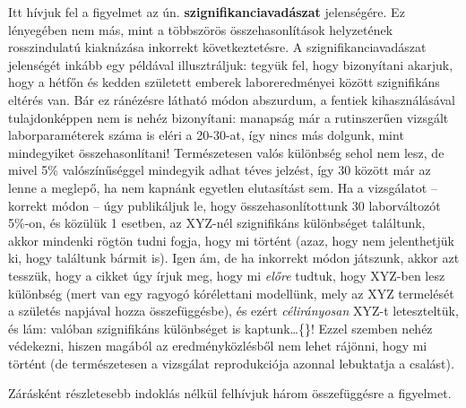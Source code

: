 \documentclass[
]{book}
\begin{document}
Itt hívjuk fel a figyelmet az ún. \textbf{szignifikanciavadászat} jelenségére. Ez lényegében nem más, mint a többszörös összehasonlítások helyzetének rosszindulatú kiaknázása inkorrekt következtetésre. A szignifikanciavadászat jelenségét inkább egy példával illusztráljuk: tegyük fel, hogy bizonyítani akarjuk, hogy a hétfőn és kedden született emberek laboreredményei között szignifikáns eltérés van. Bár ez ránézésre látható módon abszurdum, a fentiek kihasználásával tulajdonképpen nem is nehéz bizonyítani: manapság már a rutinszerűen vizsgált laborparaméterek száma is eléri a 20-30-at, így nincs más dolgunk, mint mindegyiket összehasonlítani! Természetesen valós különbség sehol nem lesz, de mivel 5\% valószínűséggel mindegyik adhat téves jelzést, így 30 között már az lenne a meglepő, ha nem kapnánk egyetlen elutasítást sem. Ha a vizsgálatot -- korrekt módon -- úgy publikáljuk le, hogy összehasonlítottunk 30 laborváltozót 5\%-on, és közülük 1 esetben, az XYZ-nél szignifikáns különbséget találtunk, akkor mindenki rögtön tudni fogja, hogy mi történt (azaz, hogy nem jelenthetjük ki, hogy találtunk bármit is). Igen ám, de ha inkorrekt módon játszunk, akkor azt tesszük, hogy a cikket úgy írjuk meg, hogy mi \emph{előre} tudtuk, hogy XYZ-ben lesz különbség (mert van egy ragyogó kórélettani modellünk, mely az XYZ termelését a születés napjával hozza összefüggésbe), és ezért \emph{célirányosan} XYZ-t leteszteltük, és lám: valóban szignifikáns különbséget is kaptunk\dots\{\}! Ezzel szemben nehéz védekezni, hiszen magából az eredményközlésből nem lehet rájönni, hogy mi történt (de természetesen a vizsgálat reprodukciója azonnal lebuktatja a csalást).

Zárásként részletesebb indoklás nélkül felhívjuk három összefüggésre a figyelmet.
\end{document}
